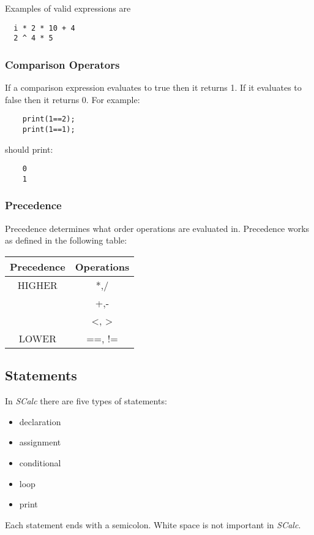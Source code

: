 \documentclass{article}
\begin{document}
Examples of valid expressions are
\begin{lstlisting}
  i * 2 * 10 + 4
  2 ^ 4 * 5
\end{lstlisting}

\subsubsection{Comparison Operators}
If a comparison expression evaluates to true then it returns 1. If it evaluates to false then it
returns 0. For example:
\begin{lstlisting}
	print(1==2);
	print(1==1);
\end{lstlisting}
should print:
\begin{lstlisting}
	0
	1
\end{lstlisting}

\subsubsection{Precedence}
Precedence determines what order operations are evaluated in. Precedence works as defined in the
following table:
\begin{center}
	\begin{tabular}{|c|c|}
	\hline
	\textbf{Precedence} & \textbf{Operations} \\
	\hline
	HIGHER
	& *,/ \\
	& +,- \\
	& <, > \\
	LOWER & ==, != \\
	\hline
	\end{tabular}
\end{center}


	\subsection {Statements}

		In \textit{SCalc} there are five types of statements:

		\begin {itemize}
			\item{declaration}
			\item{assignment}
			\item{conditional}
			\item{loop}
			\item{print}
		\end {itemize}

		Each statement ends with a semicolon.  White space is not important in \textit{SCalc}.
\end{document}
